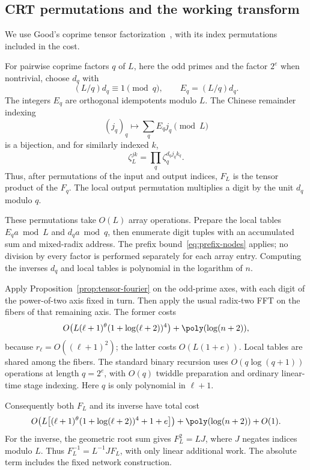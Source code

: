 \subsection{CRT permutations and the working transform}

We use Good's coprime tensor factorization~\cite[Section~12]{good1958},
with its index permutations included in the cost.

For pairwise coprime factors $q$ of $L$, here the odd primes and the factor $2^e$ when nontrivial, choose $d_q$ with
\[
 (L/q)d_q\equiv1\pmod q,
 \qquad E_q=(L/q)d_q.
\]
The integers $E_q$ are orthogonal idempotents modulo $L$. The Chinese remainder indexing
\[
 (j_q)_q\longmapsto \sum_q E_qj_q\pmod L
\]
is a bijection, and for similarly indexed $k$,
\begin{equation}\label{eq:crt-fourier}
 \zeta_L^{jk}=\prod_q\zeta_q^{d_qj_qk_q}.
\end{equation}
Thus, after permutations of the input and output indices, $F_L$ is the tensor product of the $F_q$. The local output permutation multiplies a digit by the unit $d_q$ modulo $q$.

These permutations take $O(L)$ array operations. Prepare the local tables $E_qa\bmod L$ and $d_qa\bmod q$, then enumerate digit tuples with an accumulated sum and mixed-radix address. The prefix bound~\eqref{eq:prefix-nodes} applies; no division by every factor is performed separately for each array entry. Computing the inverses $d_q$ and local tables is polynomial in the logarithm of $n$.

Apply Proposition~\ref{prop:tensor-fourier} on the odd-prime axes, with each digit of the power-of-two axis fixed in turn. Then apply the usual radix-two FFT on the fibers of that remaining axis. The former costs
\[
 O\!\left(L(\ell+1)^\theta(1+\log(\ell+2))^4\right)
   +\poly(\log(n+2)),
\]
because $r_\ell=O((\ell+1)^2)$; the latter costs $O(L(1+e))$. Local tables are shared among the fibers. The standard binary recursion uses $O(q\log(q+1))$ operations at length $q=2^e$, with $O(q)$ twiddle preparation and ordinary linear-time stage indexing. Here $q$ is only polynomial in $\ell+1$.

Consequently both $F_L$ and its inverse have total cost
\begin{equation}\label{eq:working-transform}
 O\!\left(L\bigl[(\ell+1)^\theta(1+\log(\ell+2))^4+1+e\bigr]\right)
   +\poly(\log(n+2))+O(1).
\end{equation}
For the inverse, the geometric root sum gives $F_L^2=LJ$, where $J$ negates indices modulo $L$. Thus $F_L^{-1}=L^{-1}JF_L$, with only linear additional work. The absolute term includes the fixed network construction.

